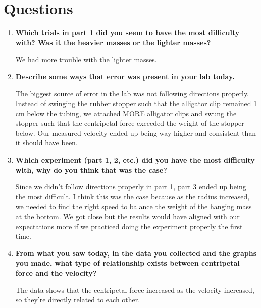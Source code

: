 
 \section{Questions}

\vspace{-0.5cm}
\singlespacing

\begin{enumerate}
	\item \textbf{Which trials in part 1 did you seem to have the most difficulty with? Was it the heavier masses or the lighter masses?}

		We had more trouble with the lighter masses. 

	\item \textbf{Describe some ways that error was present in your lab today.}
 
	The biggest source of error in the lab was not following directions properly. Instead of swinging the rubber stopper such that the alligator clip remained 1 cm below the tubing, we attached MORE alligator clips and swung the stopper such that the centripetal force exceeded the weight of the stopper below. Our measured velocity ended up being way higher and consistent than it should have been. 

\item \textbf{Which experiment (part 1, 2, etc.) did you have the most difficulty with, why do you think that was the case?}

Since we didn't follow directions properly in part 1, part 3 ended up being the most difficult. I think this was the case because as the radius increased, we needed to find the right speed to balance the weight of the hanging mass at the bottom. We got close but the results would have aligned with our expectations more if we practiced doing the experiment properly the first time.   

\item \textbf{From what you saw today, in the data you collected and the graphs you made, what type of relationship exists between centripetal force and the velocity?}

 The data shows that the centripetal force increased as the velocity increased, so they're directly related to each other.
\end{enumerate}

\newpage
